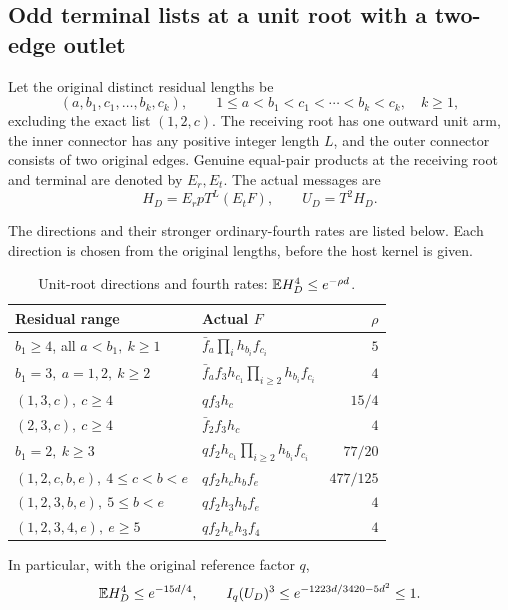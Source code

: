 \subsection{Odd terminal lists at a unit root with a two-edge outlet}
\label{proof:R2-C037}
Let the original distinct residual lengths be
\[
 (a,b_1,c_1,\ldots,b_k,c_k),\qquad
 1\le a<b_1<c_1<\cdots<b_k<c_k,\quad k\ge1,
\]
excluding the exact list \((1,2,c)\). The receiving root has one
outward unit arm, the inner connector has any positive integer
length \(L\), and the outer connector consists of two original
edges. Genuine equal-pair products at the receiving root and
terminal are denoted by \(E_r,E_t\). The actual messages are
\[
 H_D=E_rpT^L(E_tF),\qquad U_D=T^2H_D .
\]

The directions and their stronger ordinary-fourth rates are
listed below. Each direction is chosen from the original lengths,
before the host kernel is given.
\begin{table}[htbp]\centering\small
\caption{Unit-root directions and fourth rates:
 \(\mathbb E H_D^4\le e^{-\rho d}\).}
\label{tab:unit-p:outlet-directions}
\begin{tabular}{@{}p{.39\linewidth}p{.46\linewidth}r@{}}
\toprule
Residual range & Actual \(F\) & \(\rho\)\\\midrule
\(b_1\ge4\), all \(a<b_1,\ k\ge1\)
 & \(\bar f_a\prod_i h_{b_i}f_{c_i}\)&\(5\)\\
\(b_1=3,\ a=1,2,\ k\ge2\)
 & \(\bar f_af_3h_{c_1}\prod_{i\ge2}h_{b_i}f_{c_i}\)&\(4\)\\
\((1,3,c),\ c\ge4\)&\(qf_3h_c\)&\(15/4\)\\
\((2,3,c),\ c\ge4\)&\(\bar f_2f_3h_c\)&\(4\)\\
\(b_1=2,\ k\ge3\)
 & \(qf_2h_{c_1}\prod_{i\ge2}h_{b_i}f_{c_i}\)&\(77/20\)\\
\((1,2,c,b,e),\ 4\le c<b<e\)&\(qf_2h_ch_bf_e\)&\(477/125\)\\
\((1,2,3,b,e),\ 5\le b<e\)&\(qf_2h_3h_bf_e\)&\(4\)\\
\((1,2,3,4,e),\ e\ge5\)&\(qf_2h_eh_3f_4\)&\(4\)\\
\bottomrule
\end{tabular}
\end{table}
In particular, with the original reference factor \(q\),
\[
 \mathbb E H_D^4\le e^{-15d/4},\qquad
 I_q(U_D)^3\le e^{-1223d/3420-5d^2}\le1 .
\]

